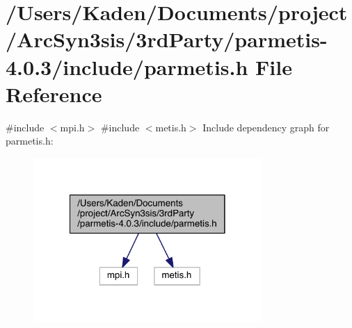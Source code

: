 \hypertarget{a00840}{}\section{/\+Users/\+Kaden/\+Documents/project/\+Arc\+Syn3sis/3rd\+Party/parmetis-\/4.0.3/include/parmetis.h File Reference}
\label{a00840}
{\ttfamily \#include $<$mpi.\+h$>$}\newline
{\ttfamily \#include $<$metis.\+h$>$}\newline
Include dependency graph for parmetis.\+h\+:\nopagebreak
\begin{figure}[H]
\begin{center}
\leavevmode
\includegraphics[width=246pt]{a00841}
\end{center}
\end{figure}
